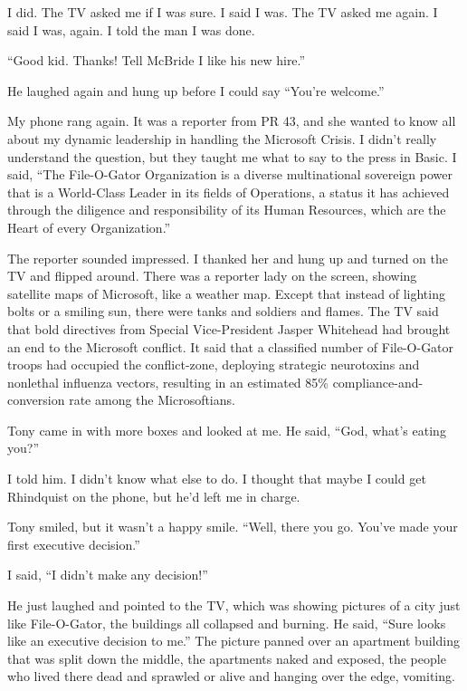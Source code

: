 I did. The TV asked me if I was sure. I said I was. The TV asked me 
again. I said I was, again. I told the man I was done.

“Good kid. Thanks! Tell McBride I like his new hire.”

He laughed again and hung up before I could say “You're welcome.”

My phone rang again. It was a reporter from PR 43, and she wanted to 
know all about my dynamic leadership in handling the Microsoft Crisis. 
I didn't really understand the question, but they taught me what to say 
to the press in Basic. I said, “The File-O-Gator Organization is a 
diverse multinational sovereign power that is a World-Class Leader in 
its fields of Operations, a status it has achieved through the 
diligence and responsibility of its Human Resources, which are the 
Heart of every Organization.”

The reporter sounded impressed. I thanked her and hung up and turned on 
the TV and flipped around. There was a reporter lady on the screen, 
showing satellite maps of Microsoft, like a weather map. Except that 
instead of lighting bolts or a smiling sun, there were tanks and 
soldiers and flames. The TV said that bold directives from Special 
Vice-President Jasper Whitehead had brought an end to the Microsoft 
conflict. It said that a classified number of File-O-Gator troops had 
occupied the conflict-zone, deploying strategic neurotoxins and 
nonlethal influenza vectors, resulting in an estimated 85\% 
compliance-and-conversion rate among the Microsoftians.

Tony came in with more boxes and looked at me. He said, “God, what's 
eating you?”

I told him. I didn't know what else to do. I thought that maybe I could 
get Rhindquist on the phone, but he'd left me in charge.

Tony smiled, but it wasn't a happy smile. “Well, there you go. You've 
made your first executive decision.”

I said, “I didn't make any decision!”

He just laughed and pointed to the TV, which was showing pictures of a 
city just like File-O-Gator, the buildings all collapsed and burning. 
He said, “Sure looks like an executive decision to me.” The picture 
panned over an apartment building that was split down the middle, the 
apartments naked and exposed, the people who lived there dead and 
sprawled or alive and hanging over the edge, vomiting.

